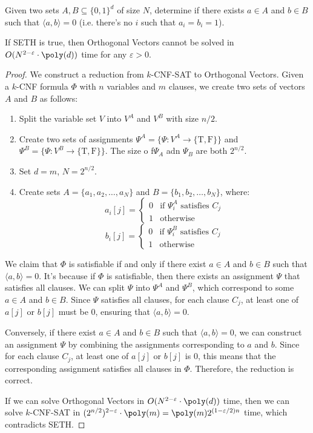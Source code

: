 \begin{problem}
Given two sets $A, B \subseteq \{0, 1\}^d$ of size $N$, determine if there exists $a \in A$ and $b \in B$ such that $\langle a, b \rangle = 0$ (i.e. there's no $i$ such that $a_i = b_i = 1$).
\end{problem}
\begin{theorem}
	If SETH is true, then Orthogonal Vectors cannot be solved in $O(N^{2-\varepsilon} \cdot \poly(d))$ time for any $\varepsilon > 0$.
\end{theorem}
\begin{proof}
	We construct a reduction from $k$-CNF-SAT to Orthogonal Vectors. Given a $k$-CNF formula $\Phi$ with $n$ variables and $m$ clauses, we create two sets of vectors $A$ and $B$ as follows:
	\begin{enumerate}
		\item Split the variable set $V$ into $V^A$ and $V^B$ with size $n/2$.
		\item Create two sets of assignments $\Psi^A = \{ \Psi : V^A \to \{\text{T}, \text{F}\} \}$ and $\Psi^B = \{ \Psi : V^B \to \{\text{T}, \text{F}\} \}$. The size o f$\Psi_A$ adn $\Psi_B$ are both $2^{n/2}$.
		\item Set $d = m$, $N = 2^{n/2}$.
		\item Create sets $A = \{a_1,a_2,\ldots,a_N\}$ and $B = \{b_1,b_2,\ldots,b_N\}$, where:
		      \[ a_i[j] = \begin{cases}
				      0 & \text{if } \Psi^A_i \text{ satisfies } C_j \\
				      1 & \text{otherwise}
			      \end{cases} \]
		      \[ b_i[j] = \begin{cases}
				      0 & \text{if } \Psi^B_i \text{ satisfies } C_j \\
				      1 & \text{otherwise}
			      \end{cases} \]
	\end{enumerate}
	We claim that $\Phi$ is satisfiable if and only if there exist $a \in A$ and $b \in B$ such that $\langle a, b \rangle = 0$.
	It's because if $\Phi$ is satisfiable, then there exists an assignment $\Psi$ that satisfies all clauses. We can split $\Psi$ into $\Psi^A$ and $\Psi^B$, which correspond to some $a \in A$ and $b \in B$. Since $\Psi$ satisfies all clauses, for each clause $C_j$, at least one of $a[j]$ or $b[j]$ must be 0, ensuring that $\langle a, b \rangle = 0$.

	Conversely, if there exist $a \in A$ and $b \in B$ such that $\langle a, b \rangle = 0$, we can construct an assignment $\Psi$ by combining the assignments corresponding to $a$ and $b$. Since for each clause $C_j$, at least one of $a[j]$ or $b[j]$ is 0, this means that the corresponding assignment satisfies all clauses in $\Phi$. Therefore, the reduction is correct.

	If we can solve Orthogonal Vectors in $O(N^{2-\varepsilon} \cdot \poly(d))$ time, then we can solve $k$-CNF-SAT in $(2^{n/2})^{2-\varepsilon} \cdot \poly(m) = \poly(m)2^{(1-\varepsilon/2)n}$ time, which contradicts SETH.
\end{proof}

